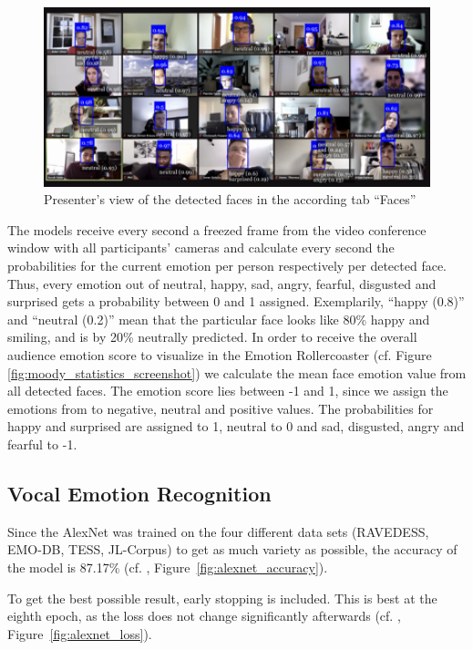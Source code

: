 \begin{figure}
\centering
\includegraphics[width=1\textwidth]{assets/moody_faces_screenshot.png}
\caption{Presenter's view of the detected faces in the according tab ``Faces''}
\label{fig:moody_faces_screenshot}
\end{figure}

The models receive every second a freezed frame from the video conference window with all participants' cameras and calculate every second the probabilities for the current  emotion per person respectively per detected face. Thus, every emotion out of neutral, happy, sad, angry, fearful, disgusted and surprised gets a probability between 0 and 1 assigned. Exemplarily, ``happy (0.8)'' and ``neutral (0.2)'' mean that the particular face looks like 80\% happy and smiling, and is by 20\% neutrally predicted. In order to receive the overall audience emotion score to visualize in the Emotion Rollercoaster (cf. Figure \ref{fig:moody_statistics_screenshot}) we calculate the mean face emotion value from all detected faces. The emotion score lies between -1 and 1, since we assign the emotions from  to negative, neutral and positive values. The probabilities for happy and surprised are assigned to 1, neutral to 0 and sad, disgusted, angry and fearful to -1.

\subsection{Vocal Emotion Recognition}
\label{subsec:results_vocal_emotion_recognition}
Since the AlexNet was trained on the four different data sets (RAVEDESS, EMO-DB, TESS, JL-Corpus) to get as much variety as possible, the accuracy of the model is 87.17\% (cf. , Figure~\ref{fig:alexnet_accuracy}). 

To get the best possible result, early stopping is included. This is best at the eighth epoch, as the loss does not change significantly afterwards (cf. , Figure~\ref{fig:alexnet_loss}).

